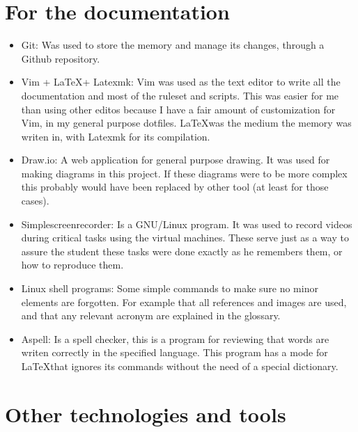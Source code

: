 \section{For the documentation}
\begin{itemize}
	\item Git: Was used to store the memory and manage its changes, through a Github repository\cite{memoria_github}.
	\item Vim + \LaTeX + Latexmk: Vim was used as the text editor to write all the documentation and most of the ruleset and scripts. This was easier for me than using other editos because I have a fair amount of customization for Vim, in my general purpose dotfiles\cite{andresgomezvidal_gitlab}. \LaTeX was the medium the memory was writen in, with Latexmk for its compilation.
	\item Draw.io: A web application for general purpose drawing\cite{drawio}. It was used for making diagrams in this project. If these diagrams were to be more complex this probably would have been replaced by other tool (at least for those cases).
	\item Simplescreenrecorder: Is a GNU/Linux program. It was used to record videos during critical tasks using the virtual machines. These serve just as a way to assure the student these tasks were done exactly as he remembers them, or how to reproduce them.
	\item Linux shell programs: Some simple commands to make sure no minor elements are forgotten. For example that all references and images are used, and that any relevant acronym are explained in the glossary.
	\item Aspell: Is a spell checker\cite{aspell}, this is a program for reviewing that words are writen correctly in the specified language. This program has a mode for \LaTeX that ignores its commands without the need of a special dictionary.
\end{itemize}

\section{Other technologies and tools}
